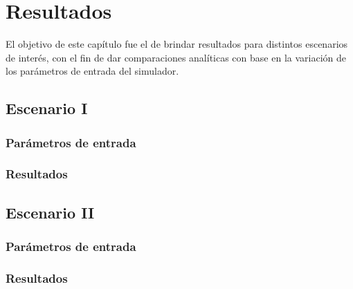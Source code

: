 
\chapter{Resultados} %

\label{Chapter7} %

El objetivo de este capítulo fue el de brindar resultados para distintos escenarios de interés, con el fin de dar comparaciones analíticas con base en la variación de los parámetros de entrada del simulador.


\section{Escenario I} 
\subsection{Parámetros de entrada}
\subsection{Resultados}


\section{Escenario II}
\subsection{Parámetros de entrada}
\subsection{Resultados}


